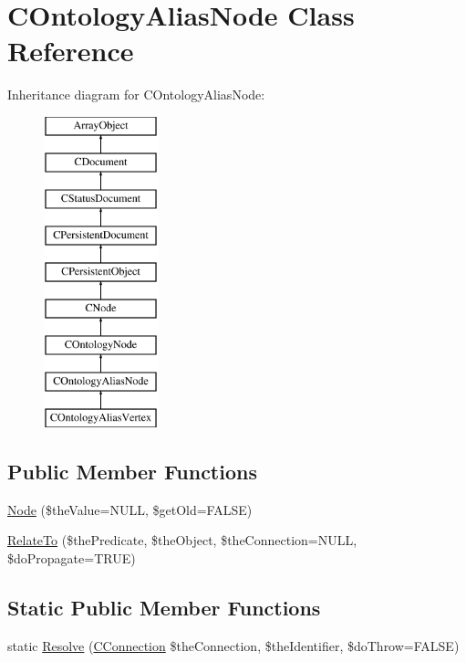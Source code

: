 \hypertarget{class_c_ontology_alias_node}{\section{C\-Ontology\-Alias\-Node Class Reference}
\label{class_c_ontology_alias_node}
}
Inheritance diagram for C\-Ontology\-Alias\-Node\-:\begin{figure}[H]
\begin{center}
\leavevmode
\includegraphics[height=9.000000cm]{class_c_ontology_alias_node}
\end{center}
\end{figure}
\subsection*{Public Member Functions}
\begin{DoxyCompactItemize}
\item 
\hyperlink{class_c_ontology_alias_node_aa9943ab171608dd41a95e0defc71820d}{Node} (\$the\-Value=N\-U\-L\-L, \$get\-Old=F\-A\-L\-S\-E)
\item 
\hyperlink{class_c_ontology_alias_node_ad82cf36f485558265dc30ac195c326f1}{Relate\-To} (\$the\-Predicate, \$the\-Object, \$the\-Connection=N\-U\-L\-L, \$do\-Propagate=T\-R\-U\-E)
\end{DoxyCompactItemize}
\subsection*{Static Public Member Functions}
\begin{DoxyCompactItemize}
\item 
static \hyperlink{class_c_ontology_alias_node_a1c50632496dcfad67765d134409cb71d}{Resolve} (\hyperlink{class_c_connection}{C\-Connection} \$the\-Connection, \$the\-Identifier, \$do\-Throw=F\-A\-L\-S\-E)
\end{DoxyCompactItemize}
